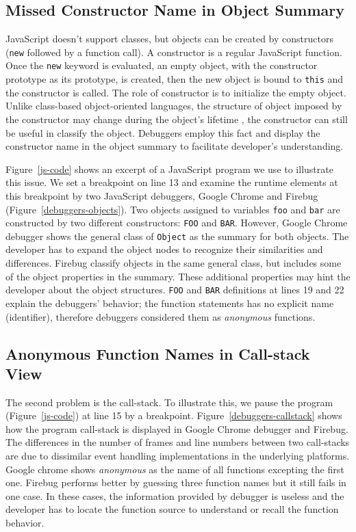 \documentclass[10pt, preprint]{sigplanconf}
\begin{document}
\subsection{Missed Constructor Name in Object Summary}
JavaScript doesn't support classes, but objects can be created by constructors ({\small\texttt{new}} followed by a function call). A constructor is a regular JavaScript function. Once the {\small\texttt{new}} keyword is evaluated, an empty object, with the constructor prototype as its prototype, is created, then the new object is bound to {\small\texttt{this}} and the constructor is called. The role of constructor is to initialize the empty object. Unlike class-based object-oriented languages, the structure of object imposed by the constructor may change during the object's lifetime \cite{Richards}, the constructor can still be useful in classify the object.
Debuggers employ this fact and display the constructor name in the object summary to facilitate developer's understanding. 

Figure~\ref{js-code} shows an excerpt of a JavaScript program we use to illustrate this issue. We set a breakpoint on line 13 and examine the runtime elements at this breakpoint by two JavaScript debuggers, Google Chrome and Firebug (Figure~\ref{debuggers-objects}). Two objects assigned to variables {\small\texttt{foo}} and {\small\texttt{bar}} are constructed by two different constructors: {\small\texttt{FOO}} and {\small\texttt{BAR}}. However, Google Chrome debugger shows the general class of {\small\texttt{Object}} as the summary for both objects. The developer has to expand the object nodes to recognize their similarities and differences. Firebug classify objects in the same general class, but includes some of the object properties in the summary. These additional properties may hint the developer about the object structures. {\small\texttt{FOO}} and {\small\texttt{BAR}} definitions at lines 19 and 22 explain the debuggers' behavior; the function statements has no explicit name (identifier), therefore debuggers considered them as \textit{anonymous} functions.


\subsection{Anonymous Function Names in Call-stack View}
The second problem is the call-stack.
To illustrate this, we pause the program (Figure~\ref{js-code}) at line 15 by a breakpoint. Figure~\ref{debuggers-callstack} shows how the program call-stack is displayed in Google Chrome debugger and Firebug. The differences in the number of frames and line numbers between two call-stacks are due to dissimilar event handling implementations in the underlying platforms. Google chrome shows \textit{anonymous} as the name of all functions excepting the first one. Firebug performs better by guessing three function names but it still fails in one case. In these cases, the information provided by debugger is useless and the developer has to locate the function source to understand or recall the function behavior. 
\end{document}
